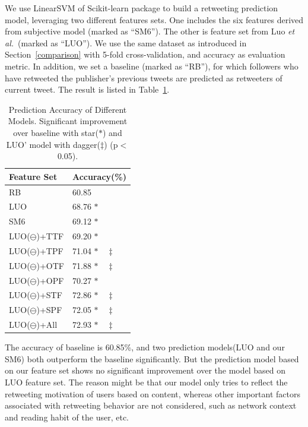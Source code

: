 \documentclass{acm_proc_article-sp}
\begin{document}
We use LinearSVM of Scikit-learn package to build a retweeting prediction model, leveraging two different features sets. One includes the six features derived from subjective model (marked as ``SM6''). The other is feature set from Luo \emph{et al.}~\cite{Luo:2013RMF}(marked as ``LUO''). We use the same dataset as introduced in Section~\ref{comparison} with 5-fold cross-validation, and accuracy as evaluation metric.
In addition, we set a baseline (marked as ``RB''), for which followers who have retweeted the publisher's previous tweets are predicted as retweeters of current tweet. 
The result is listed in Table~\ref{table2}.
\begin{table}
\centering
\caption{Prediction Accuracy of Different Models. Significant improvement over baseline with star($ \ast $) and LUO' model with dagger($ \ddagger $) (p$ < $0.05).}
\label{table2}
\begin{tabular}{|l|l|}
\hline
Feature Set & Accuracy(\%) \\
\hline
RB & 60.85  \\
LUO & 68.76 $ \ast  $\\
SM6 & 69.12  $ \ast $ \\
LUO($ \ominus $)+TTF & 69.20  $ \ast $ \\
LUO($ \ominus $)+TPF & 71.04  $ \ast \quad \ddagger $ \\
LUO($ \ominus $)+OTF & 71.88  $ \ast \quad \ddagger $ \\
LUO($ \ominus $)+OPF & 70.27  $ \ast $ \\
LUO($ \ominus $)+STF & 72.86  $ \ast \quad \ddagger $ \\
LUO($ \ominus $)+SPF & 72.05  $ \ast \quad \ddagger $ \\
LUO($ \ominus $)+All & 72.93  $ \ast \quad \ddagger $ \\
\hline
\end{tabular}
\end{table}
The accuracy of baseline is 60.85\%, and two prediction models(LUO and our SM6) both outperform the baseline significantly. 
But the prediction model based on our feature set shows no significant improvement over the model based on LUO feature set. 
The reason might be that our model only tries to reflect the retweeting motivation of users based on content, whereas other important factors associated with retweeting behavior are not considered, such as network context and reading habit of the user, etc. 
\end{document}
